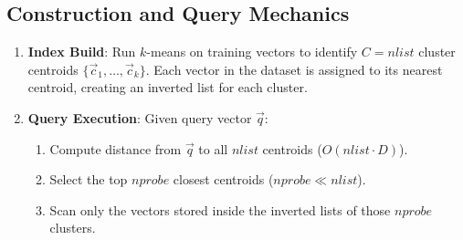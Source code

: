 \subsection{Construction and Query Mechanics}
\begin{enumerate}[leftmargin=18pt]
  \item \textbf{Index Build}: Run $k$-means on training vectors to identify $C = nlist$ cluster centroids $\{\vec{c}_1, \dots, \vec{c}_k\}$. Each vector in the dataset is assigned to its nearest centroid, creating an inverted list for each cluster.
  \item \textbf{Query Execution}: Given query vector $\vec{q}$:
  \begin{enumerate}
    \item Compute distance from $\vec{q}$ to all $nlist$ centroids ($O(nlist \cdot D)$).
    \item Select the top $nprobe$ closest centroids ($nprobe \ll nlist$).
    \item Scan only the vectors stored inside the inverted lists of those $nprobe$ clusters.
  \end{enumerate}
\end{enumerate}

